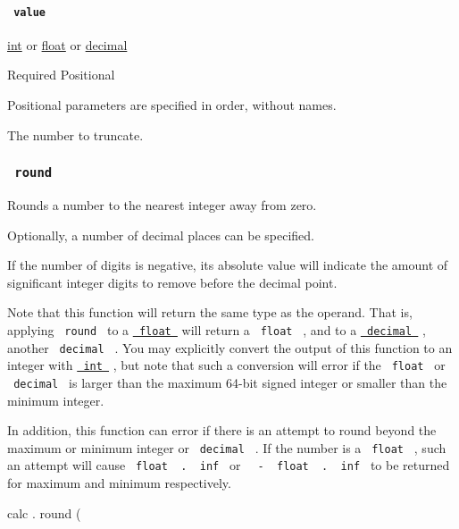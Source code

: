 \paragraph{\texorpdfstring{\texttt{\ value\ }}{ value }}\label{functions-fract-value}

\href{/docs/reference/foundations/int/}{int} {or}
\href{/docs/reference/foundations/float/}{float} {or}
\href{/docs/reference/foundations/decimal/}{decimal}

{Required} {{ Positional }}

\label{functions-fract-value-positional-tooltip}
Positional parameters are specified in order, without names.

The number to truncate.

\subsubsection{\texorpdfstring{\texttt{\ round\ }}{ round }}\label{functions-round}

Rounds a number to the nearest integer away from zero.

Optionally, a number of decimal places can be specified.

If the number of digits is negative, its absolute value will indicate
the amount of significant integer digits to remove before the decimal
point.

Note that this function will return the same type as the operand. That
is, applying \texttt{\ round\ } to a
\href{/docs/reference/foundations/float/}{\texttt{\ float\ }} will
return a \texttt{\ float\ } , and to a
\href{/docs/reference/foundations/decimal/}{\texttt{\ decimal\ }} ,
another \texttt{\ decimal\ } . You may explicitly convert the output of
this function to an integer with
\href{/docs/reference/foundations/int/}{\texttt{\ int\ }} , but note
that such a conversion will error if the \texttt{\ float\ } or
\texttt{\ decimal\ } is larger than the maximum 64-bit signed integer or
smaller than the minimum integer.

In addition, this function can error if there is an attempt to round
beyond the maximum or minimum integer or \texttt{\ decimal\ } . If the
number is a \texttt{\ float\ } , such an attempt will cause
\texttt{\ float\ }{\texttt{\ .\ }}\texttt{\ inf\ } or
\texttt{\ }{\texttt{\ -\ }}\texttt{\ float\ }{\texttt{\ .\ }}\texttt{\ inf\ }
to be returned for maximum and minimum respectively.

calc { . } { round } (


